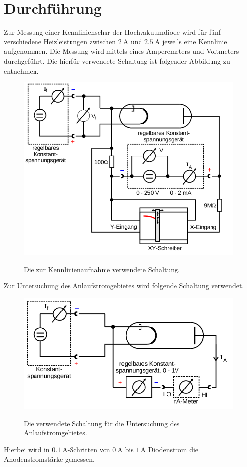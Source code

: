 \section{Durchführung}
\label{sec:Durchführung}
Zur Messung einer Kennlinienschar der Hochvakuumdiode wird für fünf
verschiedene Heizleistungen zwischen $\SI{2}{\ampere}$ und $\SI{2.5}{\ampere}$
jeweils eine Kennlinie aufgenommen. Die Messung wird mittels eines Amperemeters
und Voltmeters durchgeführt. Die hierfür verwendete Schaltung ist folgender
Abbildung zu entnehmen.
\begin{figure}[H]
  \centering
  \includegraphics[scale=0.5]{content/schaltungkennlinie.png}
  \label{fig:schaltungkennlinie}
  \caption{Die zur Kennlinienaufnahme verwendete Schaltung.}
\end{figure}
\noindent
Zur Untersuchung des Anlaufstromgebietes wird folgende Schaltung verwendet.
\begin{figure}[H]
  \centering
  \includegraphics[scale=0.5]{content/schaltunganlaufstromgebiet.png}
  \label{fig:schaltunganlaufstrom}
  \caption{Die verwendete Schaltung für die Untersuchung des Anlaufstromgebietes.}
\end{figure}
\noindent
Hierbei wird in $\SI{0.1}{\ampere}$-Schritten von $\SI{0}{\ampere}$ bis
$\SI{1}{\ampere}$ Diodenstrom die Anodenstromstärke gemessen.
